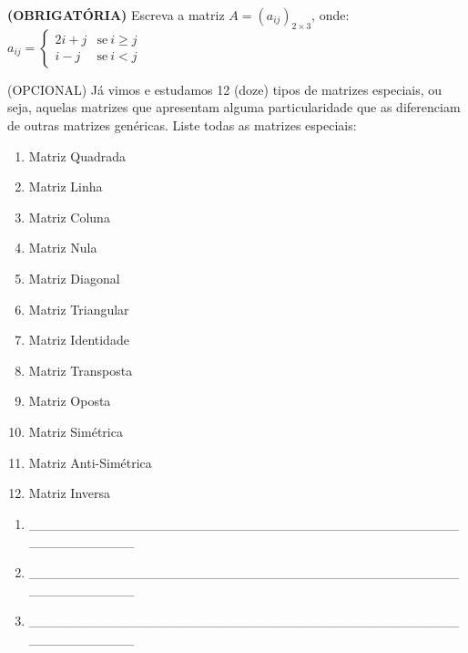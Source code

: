 \documentclass[pdftex, brazil, 12pt, oneside, addpoints]{exam}
\begin{document}
\begin{questions}
\question
\textbf{(OBRIGATÓRIA)} Escreva a matriz $A = (a_{ij})_{2 \times 3}$, onde:
$a_{ij} =
    \begin{cases}
      2i + j & \text{se}\ i \ge j\\
      i - j  & \text{se}\ i < j
    \end{cases}
$


    
\question
(OPCIONAL) Já vimos e estudamos 12 (doze) tipos de matrizes especiais, ou seja, aquelas matrizes
que apresentam alguma particularidade que as diferenciam de outras matrizes genéricas.
Liste todas as matrizes especiais:
\ifprintanswers
\begin{solution}
  \vspace{-0.7cm}
\begin{enumerate}
  \item Matriz Quadrada
  \item Matriz Linha
  \item Matriz Coluna
  \item Matriz Nula
  \item Matriz Diagonal
  \item Matriz Triangular
  \item Matriz Identidade
  \item Matriz Transposta
  \item Matriz Oposta
  \item Matriz Simétrica
  \item Matriz Anti-Simétrica
  \item Matriz Inversa
\end{enumerate}
\end{solution}
\else
\begin{enumerate}
  \item \_\_\_\_\_\_\_\_\_\_\_\_\_\_\_\_\_\_\_\_\_\_\_\_\_\_\_\_\_\_\_\_\_\_\_\_\_\_\_\_\_\_\_\_\_\_\_\_\_\_\_\_\_\_\_\_
  \item \_\_\_\_\_\_\_\_\_\_\_\_\_\_\_\_\_\_\_\_\_\_\_\_\_\_\_\_\_\_\_\_\_\_\_\_\_\_\_\_\_\_\_\_\_\_\_\_\_\_\_\_\_\_\_\_
  \item \_\_\_\_\_\_\_\_\_\_\_\_\_\_\_\_\_\_\_\_\_\_\_\_\_\_\_\_\_\_\_\_\_\_\_\_\_\_\_\_\_\_\_\_\_\_\_\_\_\_\_\_\_\_\_\_

\end{enumerate}
\end{questions}
\end{document}

